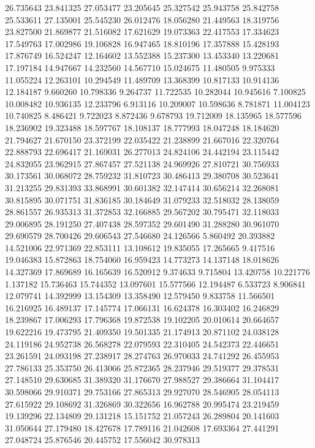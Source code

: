 26.735643
23.841325
27.053477
23.205645
25.327542
25.943758
25.842758
25.533611
27.135001
25.545230
26.012476
18.056280
21.449563
18.319756
23.827500
21.869877
21.516082
17.621629
19.073363
22.417553
17.334623
17.549763
17.002986
19.106828
16.947465
18.810196
17.357888
15.428193
17.876749
16.524247
12.164602
13.552388
15.237300
13.453340
13.220681
17.197184
14.947667
14.232560
14.567710
15.024675
11.480505
9.975333
11.055224
12.263101
10.294549
11.489709
13.368399
10.817133
10.914136
12.184187
9.660260
10.798336
9.264737
11.722535
10.282044
10.945616
7.100825
10.008482
10.936135
12.233796
6.913116
10.209007
10.598636
8.781871
11.004123
10.740825
8.486421
9.722023
8.872436
9.678793
19.712009
18.135965
18.577596
18.236902
19.323488
18.597767
18.108137
18.777993
18.047248
18.184620
21.794627
21.670150
23.372199
22.035422
21.238899
21.667016
22.320764
22.888793
22.696417
21.169031
26.277013
24.824106
24.442194
23.115442
24.832055
23.962915
27.867457
27.521138
24.969926
27.810721
30.756933
30.173561
30.068072
28.759232
31.810723
30.486413
29.380708
30.523641
31.213255
29.831393
33.868991
30.601382
32.147414
30.656214
32.268081
30.815895
30.071751
31.836185
30.184649
31.079233
32.518032
28.138059
28.861557
26.935313
31.372853
32.166885
29.567202
30.795471
32.118033
29.006895
28.191250
27.407438
28.597352
29.601490
31.288280
30.961070
29.690579
28.700426
29.606543
27.546680
24.126566
5.860492
20.393882
14.521006
22.971369
22.853111
13.108612
19.835055
17.265665
9.417516
19.046383
15.872863
18.754060
16.959423
14.773273
14.137148
18.018626
14.327369
17.869689
16.165639
16.520912
9.374633
9.715804
13.420758
10.221776
1.137182
15.736463
15.744352
13.097601
15.577566
12.194487
6.533723
8.906841
12.079741
14.392999
13.154309
13.358490
12.579450
9.833758
11.566501
16.216925
16.489137
17.145774
17.066131
16.624378
16.303402
16.246829
18.239867
17.006293
17.796368
19.872538
19.102205
20.010614
20.664657
19.622216
19.473795
21.409350
19.501335
21.174913
20.871102
24.038128
24.119186
24.952738
26.568278
22.079593
22.310405
24.542373
22.446651
23.261591
24.093198
27.238917
28.274763
26.970033
24.741292
26.455953
27.786133
25.353750
26.413066
25.872365
28.237946
29.519377
29.378531
27.148510
29.630685
31.389320
31.176670
27.988527
29.386664
31.104417
30.598066
29.910371
29.753166
27.865313
29.927070
28.546905
28.054113
27.615922
29.108692
31.326869
30.322656
16.962788
20.995474
23.219459
19.139296
22.134809
29.131218
15.151752
21.057243
26.289804
20.141603
31.050644
27.179480
18.427678
17.789116
21.042608
17.693364
27.441291
27.048724
25.876546
20.445752
17.556042
30.978313
